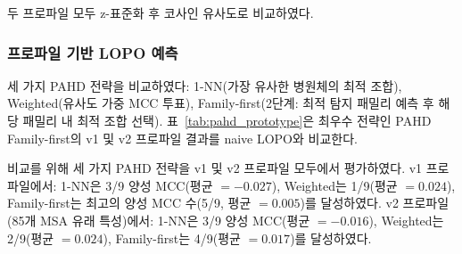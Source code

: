 두 프로파일 모두 z-표준화 후 코사인 유사도로 비교하였다.

\subsubsection{프로파일 기반 LOPO 예측}

세 가지 PAHD 전략을 비교하였다: 1-NN(가장 유사한 병원체의 최적 조합), Weighted(유사도 가중 MCC 투표), Family-first(2단계: 최적 탐지 패밀리 예측 후 해당 패밀리 내 최적 조합 선택).
표~\ref{tab:pahd_prototype}은 최우수 전략인 PAHD Family-first의 v1 및 v2 프로파일 결과를 naive LOPO와 비교한다.

\begin{table}[htbp]
\centering
\caption{Naive LOPO 대 PAHD Family-first 프로토타입의 병원체별 테스트 MCC 비교 (v1: 8개 특성, v2: 85개 MSA 유래 특성). Oracle은 각 병원체의 최적 조합 MCC이다. 프로파일 특성은 순수 게놈 특성만 사용(oracle 성능 정보 미포함).}
\label{tab:pahd_prototype}
\end{table}

비교를 위해 세 가지 PAHD 전략을 v1 및 v2 프로파일 모두에서 평가하였다. v1 프로파일에서: 1-NN은 3/9 양성 MCC(평균 $= -0.027$), Weighted는 1/9(평균 $= 0.024$), Family-first는 최고의 양성 MCC 수(5/9, 평균 $= 0.005$)를 달성하였다. v2 프로파일(85개 MSA 유래 특성)에서: 1-NN은 3/9 양성 MCC(평균 $= -0.016$), Weighted는 2/9(평균 $= 0.024$), Family-first는 4/9(평균 $= 0.017$)를 달성하였다.


